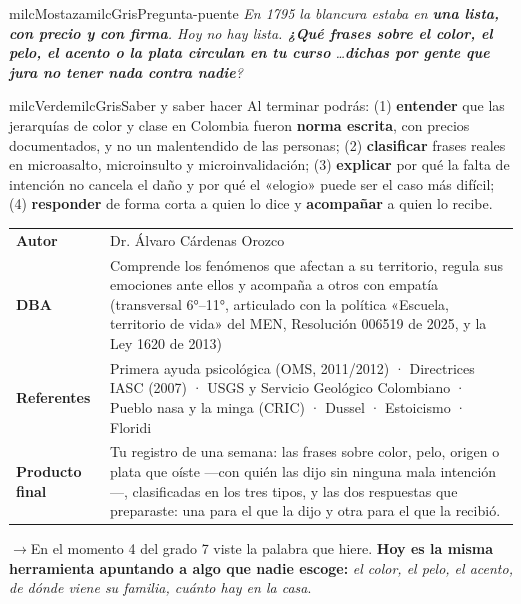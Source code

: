 \documentclass[11pt,letterpaper]{article}
\newcommand{\puente}[1]{%
  \begin{puentebox}%
    \textcolor{milcGradeDark}{$\rightarrow$}\hspace{2mm}#1%
  \end{puentebox}%
}
\begin{document}
\begin{softbox}{milcMostaza}{milcGris}{Pregunta-puente}
\textit{En 1795 la blancura estaba en \textbf{una lista, con precio y con firma}. Hoy no hay lista. \textbf{¿Qué frases sobre el color, el pelo, el acento o la plata circulan en tu curso} \ldots \textbf{dichas por gente que jura no tener nada contra nadie}?}
\end{softbox}

\begin{softbox}{milcVerde}{milcGris}{Saber y saber hacer}
Al terminar podrás: (1) \textbf{entender} que las jerarquías de color y clase en Colombia fueron \textbf{norma escrita}, con precios documentados, y no un malentendido de las personas; (2) \textbf{clasificar} frases reales en microasalto, microinsulto y microinvalidación; (3) \textbf{explicar} por qué la falta de intención no cancela el daño y por qué el «elogio» puede ser el caso más difícil; (4) \textbf{responder} de forma corta a quien lo dice y \textbf{acompañar} a quien lo recibe.
\end{softbox}



\small
\begin{tabularx}{\textwidth}{>{\bfseries}p{3.0cm}Y}
Autor & Dr. Álvaro Cárdenas Orozco\\
DBA & Comprende los fenómenos que afectan a su territorio, regula sus emociones ante ellos y acompaña a otros con empatía (transversal 6°--11°, articulado con la política «Escuela, territorio de vida» del MEN, Resolución 006519 de 2025, y la Ley 1620 de 2013)\\
Referentes & Primera ayuda psicológica (OMS, 2011/2012) · Directrices IASC (2007) · USGS y Servicio Geológico Colombiano · Pueblo nasa y la minga (CRIC) · Dussel · Estoicismo · Floridi\\
Producto final & Tu registro de una semana: las frases sobre color, pelo, origen o plata que oíste —con quién las dijo sin ninguna mala intención—, clasificadas en los tres tipos, y las dos respuestas que preparaste: una para el que la dijo y otra para el que la recibió.\\
\end{tabularx}
\normalsize

\puente{En el momento 4 del grado 7 viste la palabra que hiere. \textbf{Hoy es la misma herramienta apuntando a algo que nadie escoge:} \emph{el color, el pelo, el acento, de dónde viene su familia, cuánto hay en la casa}.}
\end{document}
